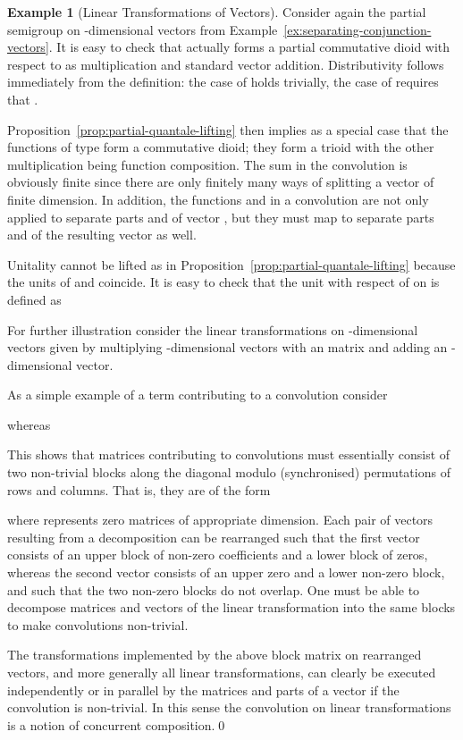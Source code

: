 \documentclass[12pt]{article}
\theoremstyle{definition}
\newtheorem{example}{Example}
\begin{document}
\begin{example}[Linear Transformations of Vectors]\label{ex:lin-trafos}
  Consider again the partial semigroup  on -dimensional
  vectors from Example~\ref{ex:separating-conjunction-vectors}. It is
  easy to check that  actually forms a partial commutative dioid
  with respect to  as multiplication and standard vector
  addition. Distributivity  follows
  immediately from the definition: the case of  holds
  trivially, the case of  requires that .

  Proposition~\ref{prop:partial-quantale-lifting} then implies as a
  special case that the functions of type  form a commutative
  dioid; they form a trioid with the other multiplication being
  function composition. The sum in the convolution is obviously finite
  since there are only finitely many ways of splitting a vector of
  finite dimension.  In addition, the functions  and  in a
  convolution are not only applied to separate parts  and  of
  vector , but they must map to separate parts  and  of
  the resulting vector as well.

  Unitality cannot be lifted as in
  Proposition~\ref{prop:partial-quantale-lifting} because the units of
   and  coincide. It is easy to check that the unit with
  respect of  on  is defined as


For further illustration consider the linear transformations on
-dimensional vectors given by multiplying -dimensional vectors
with an  matrix and adding an -dimensional vector.

As a simple example of a term contributing to a convolution consider

whereas

This shows that matrices contributing to convolutions must essentially
consist of two non-trivial blocks along the diagonal modulo
(synchronised) permutations of rows and columns. That is, they are of
the form

where  represents zero matrices of appropriate
dimension. Each pair of vectors resulting from a decomposition can be
rearranged such that the first vector consists of an upper block of
non-zero coefficients and a lower block of zeros, whereas the second
vector consists of an upper zero and a lower non-zero block, and such
that the two non-zero blocks do not overlap. One must be able to
decompose matrices and vectors of the linear transformation into the
same blocks to make convolutions non-trivial.

The transformations implemented by the above block matrix on
rearranged vectors, and more generally all linear transformations, can
clearly be executed independently or in parallel by the matrices 
and  parts of a vector if the convolution is non-trivial.  In
this sense the convolution  on linear transformations is a
notion of concurrent composition.\qed
\end{example}
\end{document}
